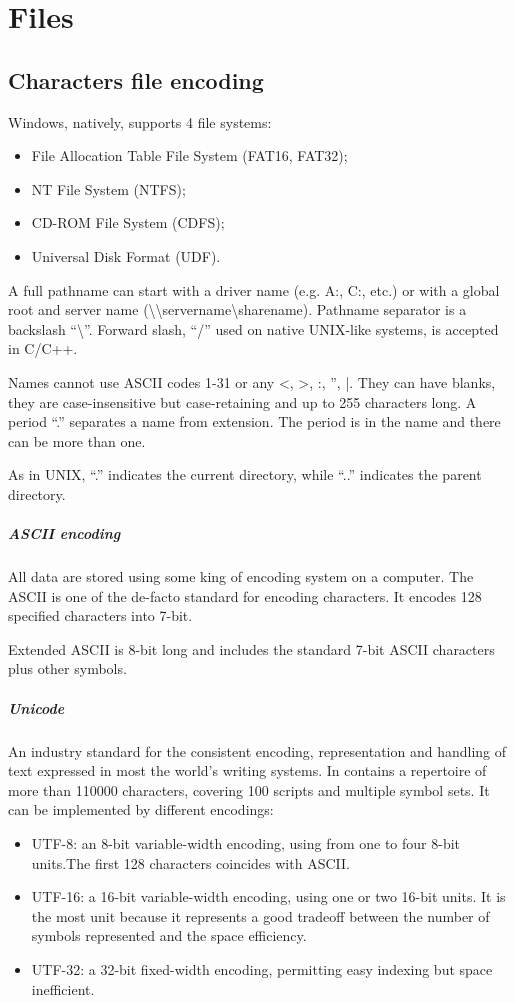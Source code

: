 \chapter{Files}
\section{Characters file encoding}
Windows, natively, supports 4 file systems:
\begin{itemize}
\item File Allocation Table File System (FAT16, FAT32);
\item NT File System (NTFS);
\item CD-ROM File System (CDFS);
\item Universal Disk Format (UDF).
\end{itemize}

A full pathname can start with a driver name (e.g. A:, C:, etc.) or with a global root and server name (\textbackslash\textbackslash servername\textbackslash sharename). Pathname separator is a backslash ``\textbackslash''. Forward slash, ``/'' used on native UNIX-like systems, is accepted in C/C++.

Names cannot use ASCII codes 1-31 or any <, >, :, '', |. They can have blanks, they are case-insensitive but case-retaining and up to 255 characters long. A period ``.'' separates a name from extension. The period is in the name and there can be more than one.

As in UNIX, ``.'' indicates the current directory, while ``..'' indicates the parent directory.

\paragraph{ASCII encoding}
All data are stored using some king of encoding system on a computer. The ASCII is one of the de-facto standard for encoding characters. It encodes 128 specified characters into 7-bit.

Extended ASCII is 8-bit long and includes the standard 7-bit ASCII characters plus other symbols.

\paragraph{Unicode}
An industry standard for the consistent encoding, representation and handling of text expressed in most the world's writing systems. In contains a repertoire of more than 110000 characters, covering 100 scripts and multiple symbol sets. It can be implemented by different encodings:
\begin{itemize}
\item UTF-8: an 8-bit variable-width encoding, using from one to four 8-bit units.The first 128 characters coincides with ASCII.
\item UTF-16: a 16-bit variable-width encoding, using one or two 16-bit units. It is the most unit because it represents a good tradeoff between the number of symbols represented and the space efficiency.
\item UTF-32: a 32-bit fixed-width encoding, permitting easy indexing but space inefficient.
\end{itemize}

